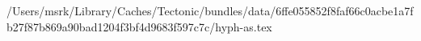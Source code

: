 /Users/msrk/Library/Caches/Tectonic/bundles/data/6ffe055852f8faf66c0acbe1a7fb27f87b869a90bad1204f3bf4d9683f597c7c/hyph-as.tex